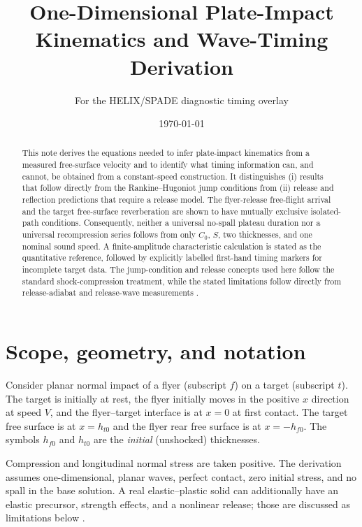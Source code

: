 \documentclass[11pt]{article}
\title{One-Dimensional Plate-Impact Kinematics and Wave-Timing Derivation}
\author{For the HELIX/SPADE diagnostic timing overlay}
\date{\today}
\begin{document}
\maketitle

\begin{abstract}
This note derives the equations needed to infer plate-impact kinematics from a
measured free-surface velocity and to identify what timing information can,
and cannot, be obtained from a constant-speed construction.  It distinguishes
(i) results that follow directly from the Rankine--Hugoniot jump conditions
from (ii) release and reflection predictions that require a release model.
The flyer-release free-flight arrival and the target free-surface reverberation
are shown to have mutually exclusive isolated-path conditions.  Consequently,
neither a universal no-spall plateau duration nor a universal recompression
series follows from only $C_0$, $S$, two thicknesses, and one nominal sound
speed.  A finite-amplitude characteristic calculation is stated as the
quantitative reference, followed by explicitly labelled first-hand timing
markers for incomplete target data.  The jump-condition and release concepts
used here follow the standard
shock-compression treatment, while the stated limitations follow directly from
release-adiabat and release-wave measurements \cite{Rice1958,Kerley2008,Hawreliak2024}.
\end{abstract}

\tableofcontents

\section{Scope, geometry, and notation}

Consider planar normal impact of a flyer (subscript $f$) on a target
(subscript $t$).  The target is initially at rest, the flyer initially moves
in the positive $x$ direction at speed $V$, and the flyer--target interface is
at $x=0$ at first contact.  The target free surface is at $x=h_{t0}$ and the
flyer rear free surface is at $x=-h_{f0}$.  The symbols $h_{f0}$ and $h_{t0}$
are the \emph{initial} (unshocked) thicknesses.

Compression and longitudinal normal stress are taken positive.  The
derivation assumes one-dimensional, planar waves, perfect contact, zero
initial stress, and no spall in the base solution.  A real elastic--plastic
solid can additionally have an elastic precursor, strength effects, and a
nonlinear release; those are discussed as limitations below
\cite{Rice1958,Hawreliak2024}.
\end{document}
